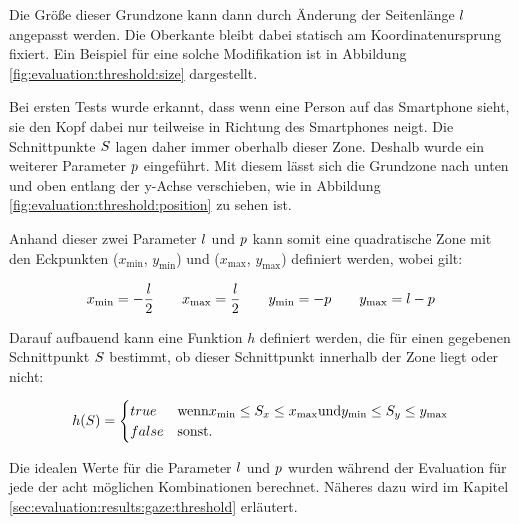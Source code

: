 Die Größe dieser Grundzone kann dann durch Änderung der Seitenlänge $l$ angepasst werden. Die Oberkante bleibt dabei statisch am Koordinatenursprung fixiert. Ein Beispiel für eine solche Modifikation ist in Abbildung \ref{fig:evaluation:threshold:size} dargestellt.

Bei ersten Tests wurde erkannt, dass wenn eine Person auf das Smartphone sieht, sie den Kopf dabei nur teilweise in Richtung des Smartphones neigt. Die Schnittpunkte $S$ lagen daher immer oberhalb dieser Zone. Deshalb wurde ein weiterer Parameter $p$ eingeführt. Mit diesem lässt sich die Grundzone nach unten und oben entlang der y-Achse verschieben, wie in Abbildung \ref{fig:evaluation:threshold:position} zu sehen ist.

Anhand dieser zwei Parameter $l$ und $p$ kann somit eine quadratische Zone mit den Eckpunkten ($x_{\text{min}}$, $y_{\text{min}}$) und ($x_{\text{max}}$, $y_{\text{max}}$) definiert werden, wobei gilt:

\[
x_{\text{min}} = - \frac{l}{2} \qquad
x_{\text{max}} = \frac{l}{2} \qquad
y_{\text{min}} = -p \qquad
y_{\text{max}} = l - p
\]

Darauf aufbauend kann eine Funktion $h$ definiert werden, die für einen gegebenen Schnittpunkt $S$ bestimmt, ob dieser Schnittpunkt innerhalb der Zone liegt oder nicht:

\[h(S) = \begin{cases}
      true & \text{wenn} x_{\text{min}} \leq S_x \leq x_{\text{max}} \text{und} y_{\text{min}} \leq S_y \leq y_{\text{max}} \\
      false & \text{sonst}.
\end{cases}\]

Die idealen Werte für die Parameter $l$ und $p$ wurden während der Evaluation für jede der acht möglichen Kombinationen berechnet. Näheres dazu wird im Kapitel \ref{sec:evaluation:results:gaze:threshold} erläutert. 

